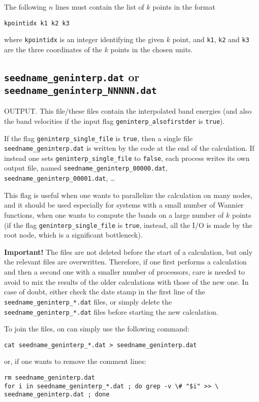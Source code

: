 The following $n$ lines must contain the list of $k$ points in the
format
\begin{verbatim}
kpointidx k1 k2 k3
\end{verbatim}
where \verb#kpointidx# is an integer identifying the given $k$ point,
and \verb#k1#, \verb#k2# and \verb#k3# are the three coordinates of the
$k$ points in the chosen units.


\subsection{{\tt seedname\_geninterp.dat} or {\tt
    seedname\_geninterp\_NNNNN.dat}}
\label{sec:seedname.geninterp.dat}
OUTPUT. This file/these files contain the interpolated band energies (and also the band
velocities if the input flag \verb#geninterp_alsofirstder# is \verb#true#).

If the flag \verb|geninterp_single_file| is \verb|true|, then a single
file {\tt seedname\_geninterp.dat} is written by the code at the end
of the calculation. If instead one sets \verb|geninterp_single_file|
to \verb|false|, each process writes its own output file, named 
{\tt seedname\_geninterp\_00000.dat}, {\tt
  seedname\_geninterp\_00001.dat}, \ldots

This flag is useful when one wants to parallelize the calculation on
many nodes, and it should be used especially for systems with a small
number of Wannier functions, when one wants to compute the bands on a
large number of $k$ points (if the flag \verb|geninterp_single_file|
is \verb|true|, instead, all the I/O is made by the root node, which
is a significant bottleneck).

{\bf Important!} The files are not deleted before the start of a
calculation, but only the relevant files are overwritten. Therefore,
if one first performs a calculation and then a second one with a smaller
number of processors, care is needed to avoid to mix the results of
the older calculations with those of the new one. In case of doubt,
either check the date stamp in the first line of the {\tt
    seedname\_geninterp\_*.dat} files, or simply
delete the  {\tt
    seedname\_geninterp\_*.dat} files before starting the new
  calculation.

To join the files, on can simply use the following command:
\begin{verbatim}
cat seedname_geninterp_*.dat > seedname_geninterp.dat
\end{verbatim}
or, if one wants to remove the comment lines:
\begin{verbatim}
rm seedname_geninterp.dat
for i in seedname_geninterp_*.dat ; do grep -v \# "$i" >> \
seedname_geninterp.dat ; done
\end{verbatim}


